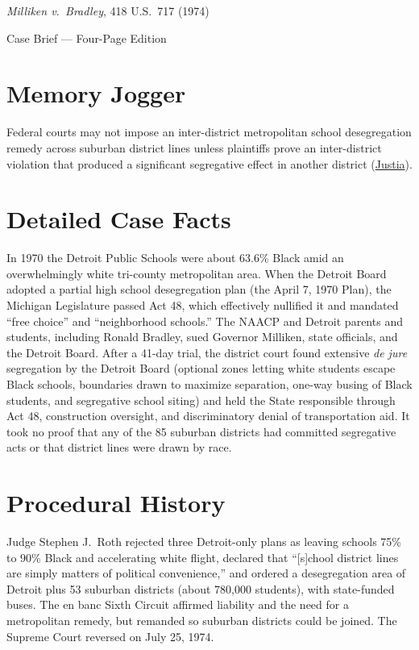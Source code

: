 \documentclass[12pt]{article}
\begin{document}
\begin{center}
{\LARGE \textit{Milliken v.\ Bradley}, 418 U.S.\ 717 (1974)\par}
\vspace{0.8em}
{\large Case Brief --- Four-Page Edition\par}
\end{center}
\vspace{1em}

\section{Memory Jogger}

Federal courts may not impose an inter-district metropolitan school desegregation remedy across suburban district lines unless plaintiffs prove an inter-district violation that produced a significant segregative effect in another district (\href{https://supreme.justia.com/cases/federal/us/418/717/}{Justia}).

\section{Detailed Case Facts}

In 1970 the Detroit Public Schools were about 63.6\% Black amid an overwhelmingly white tri-county metropolitan area. When the Detroit Board adopted a partial high school desegregation plan (the April 7, 1970 Plan), the Michigan Legislature passed Act 48, which effectively nullified it and mandated ``free choice'' and ``neighborhood schools.'' The NAACP and Detroit parents and students, including Ronald Bradley, sued Governor Milliken, state officials, and the Detroit Board. After a 41-day trial, the district court found extensive \textit{de jure} segregation by the Detroit Board (optional zones letting white students escape Black schools, boundaries drawn to maximize separation, one-way busing of Black students, and segregative school siting) and held the State responsible through Act 48, construction oversight, and discriminatory denial of transportation aid. It took no proof that any of the 85 suburban districts had committed segregative acts or that district lines were drawn by race.

\section{Procedural History}

Judge Stephen J.\ Roth rejected three Detroit-only plans as leaving schools 75\% to 90\% Black and accelerating white flight, declared that ``[s]chool district lines are simply matters of political convenience,'' and ordered a desegregation area of Detroit plus 53 suburban districts (about 780,000 students), with state-funded buses. The en banc Sixth Circuit affirmed liability and the need for a metropolitan remedy, but remanded so suburban districts could be joined. The Supreme Court reversed on July 25, 1974.
\end{document}
